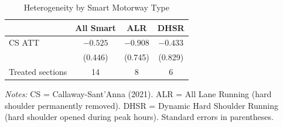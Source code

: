 \begin{table}[htbp]
\centering
\caption{Heterogeneity by Smart Motorway Type}
\label{tab:heterogeneity}
\small
\begin{tabular}{lccc}
\toprule
 & All Smart & ALR & DHSR \\
\midrule
  CS ATT & $-0.525$ & $-0.908$ & $-0.433$ \\
   & (0.446) & (0.745) & (0.829) \\
  Treated sections & 14 & 8 & 6 \\
\bottomrule
\end{tabular}
\begin{tablenotes}
\item \textit{Notes:} CS = Callaway-Sant'Anna (2021). ALR = All Lane Running (hard shoulder permanently removed). DHSR = Dynamic Hard Shoulder Running (hard shoulder opened during peak hours). Standard errors in parentheses.
\end{tablenotes}
\end{table}
